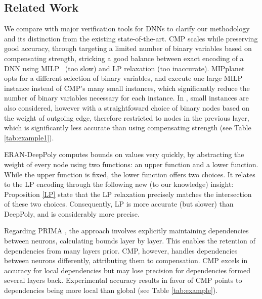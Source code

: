 \subsection{Related Work} 

We compare {\CMP} with major verification tools for DNNs to clarify our methodology and its distinction from the existing state-of-the-art. CMP scales while preserving good accuracy, through targeting a limited number of binary variables based on compensating strength, stricking a good balance between exact encoding of a DNN using MILP~\cite{MILP} (too slow) and LP relaxation (too inaccurate). MIPplanet~\cite{MIPplanet} opts for a different selection of binary variables, and execute one large MILP instance instead of CMP's many small instances, which significantly reduce the number of binary variables necessary for each instance. In \cite{9211410}, small instances are also considered, however with a straightfoward choice of binary nodes based on the weight of outgoing edge, therefore restricted to nodes in the previous layer, which is significantly less accurate than using compensating strength (see Table \ref{tab:example1}).

ERAN-DeepPoly \cite{deeppoly} computes bounds on values very quickly, by abstracting the weight of every node using two functions: an upper function and a lower function. While the upper function is fixed, the lower function offers two choices.
It relates to the LP encoding through the following new (to our knowledge) insight:  Proposition \ref{LP} state that the LP relaxation precisely matches the intersection of these two choices. Consequently, LP is more accurate (but slower) than DeepPoly, and \CMP is considerably more precise.

Regarding PRIMA \cite{prima}, the approach involves explicitly maintaining dependencies between neurons, calculating bounds layer by layer. This enables the retention of dependencies from many layers prior. CMP, however, handles dependencies between neurons differently, attributing them to compensation. CMP excels in accuracy for local dependencies but may lose precision for dependencies formed several layers back. 
Experimental accuracy results in favor of CMP points to dependencies being more local than global (see Table \ref{tab:example}).



